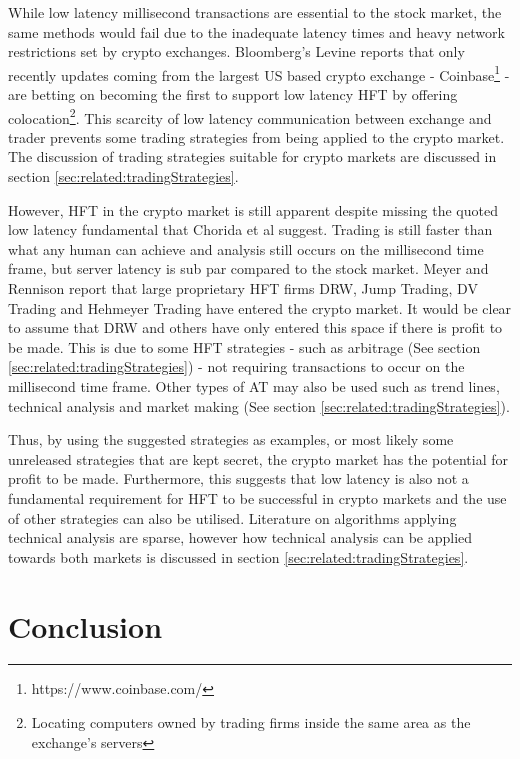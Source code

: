 While low latency millisecond transactions are essential to the stock market, the same methods would fail due to the inadequate latency times and heavy network restrictions set by crypto exchanges. Bloomberg's Levine reports \cite{WEB:Levine:2018} that only recently updates coming from the largest US based crypto exchange - Coinbase\footnote{https://www.coinbase.com/} - are betting on becoming the first to support low latency HFT by offering colocation\footnote{Locating computers owned by trading firms inside the same area as the exchange's servers}. This scarcity of low latency communication between exchange and trader prevents some trading strategies from being applied to the crypto market. The discussion of trading strategies suitable for crypto markets are discussed in section \ref{sec:related:tradingStrategies}.

However, HFT in the crypto market is still apparent despite missing the quoted low latency fundamental that Chorida et al \cite{REPORT:ChordiaEtAl:2013} suggest. Trading is still faster than what any human can achieve and analysis still occurs on the millisecond time frame, but server latency is sub par compared to the stock market. Meyer and Rennison \cite{ART:Meyer:2017} report that large proprietary HFT firms DRW, Jump Trading, DV Trading and Hehmeyer Trading have entered the crypto market. It would be clear to assume that DRW and others have only entered this space if there is profit to be made. This is due to some HFT strategies - such as arbitrage (See section \ref{sec:related:tradingStrategies}) - not requiring transactions to occur on the millisecond time frame. Other types of AT may also be used such as trend lines, technical analysis and market making (See section \ref{sec:related:tradingStrategies}). 

Thus, by using the suggested strategies as examples, or most likely some unreleased strategies that are kept secret, the crypto market has the potential for profit to be made. Furthermore, this suggests that low latency is also not a fundamental requirement for HFT to be successful in crypto markets and the use of other strategies can also be utilised. Literature on algorithms applying technical analysis are sparse, however how technical analysis can be applied towards both markets is discussed in section \ref{sec:related:tradingStrategies}.


\section{Conclusion}
\label{sec:related:conclusion}


